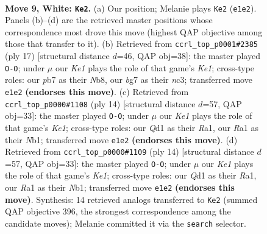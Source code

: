 \documentclass[11pt]{article}
\begin{document}
\clearpage

\begin{figure}[p]\centering
\begin{subfigure}{0.46\textwidth}\centering
\resizebox{\linewidth}{!}{%
\newchessgame
\chessboard[
  setfen={rnbqk2r/ppp2pb1/1n1p2p1/7p/3P4/1B3N2/PPP2PPP/RNBQK1R1 w Qkq - 0 9},
  showmover=false,
  pgfstyle=straightmove, color=movearrow, markmove={e1-e2}
]}
\caption{}
\end{subfigure}\hfill
\begin{subfigure}{0.46\textwidth}\centering
\resizebox{\linewidth}{!}{%
\newchessgame
\chessboard[
  setfen={rnbqk2r/1p2bppp/p4n2/3p4/3N4/2N1P1P1/PP3PBP/R1BQK2R b KQkq - 2 9},
  showmover=false,
  pgfstyle=straightmove, color=movearrow, markmove={e8-g8}
]}
\caption{}
\end{subfigure}
\\[4pt]
\begin{subfigure}{0.46\textwidth}\centering
\resizebox{\linewidth}{!}{%
\newchessgame
\chessboard[
  setfen={r1bqk1nr/bp1p1ppp/p1n1p3/8/4P3/1N1B4/PPP1QPPP/RNB1K2R w KQkq - 6 8},
  showmover=false,
  pgfstyle=straightmove, color=movearrow, markmove={e1-g1}
]}
\caption{}
\end{subfigure}\hfill
\begin{subfigure}{0.46\textwidth}\centering
\resizebox{\linewidth}{!}{%
\newchessgame
\chessboard[
  setfen={r1bqk1nr/bp1p1ppp/p1n1p3/8/4P3/1N1B4/PPP1QPPP/RNB1K2R w KQkq - 6 8},
  showmover=false,
  pgfstyle=straightmove, color=movearrow, markmove={e1-g1}
]}
\caption{}
\end{subfigure}
\caption{\textbf{Move 9, White: \texttt{Ke2}.} (a) Our position; Melanie plays \texttt{Ke2} (\texttt{e1e2}). Panels (b)--(d) are the retrieved master positions whose correspondence most drove this move (highest QAP objective among those that transfer to it). (b) Retrieved from \texttt{ccrl\_top\_p0001\#2385} (ply 17) [structural distance $d$=46, QAP obj=38]: the master played \texttt{O-O}; under $\mu$ our \emph{Ke1} plays the role of that game's \emph{Ke1}; cross-type roles: our \emph{p}b7 as their \emph{N}b8, our \emph{b}g7 as their \emph{n}c3; transferred move \texttt{e1e2} \textbf{(endorses this move)}. (c) Retrieved from \texttt{ccrl\_top\_p0000\#1108} (ply 14) [structural distance $d$=57, QAP obj=33]: the master played \texttt{O-O}; under $\mu$ our \emph{Ke1} plays the role of that game's \emph{Ke1}; cross-type roles: our \emph{Q}d1 as their \emph{R}a1, our \emph{R}a1 as their \emph{N}b1; transferred move \texttt{e1e2} \textbf{(endorses this move)}. (d) Retrieved from \texttt{ccrl\_top\_p0000\#1109} (ply 14) [structural distance $d$=57, QAP obj=33]: the master played \texttt{O-O}; under $\mu$ our \emph{Ke1} plays the role of that game's \emph{Ke1}; cross-type roles: our \emph{Q}d1 as their \emph{R}a1, our \emph{R}a1 as their \emph{N}b1; transferred move \texttt{e1e2} \textbf{(endorses this move)}. Synthesis: 14 retrieved analogs transferred to \texttt{Ke2} (summed QAP objective 396, the strongest correspondence among the candidate moves); Melanie committed it via the \texttt{search} selector.}
\label{fig:thought-m16}
\end{figure}
\end{document}
